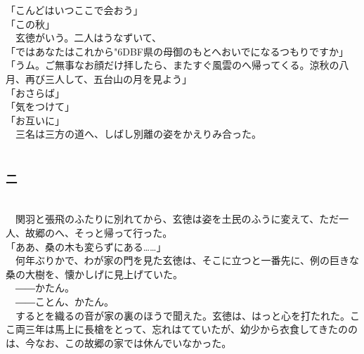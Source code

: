 \documentclass[
  paper=a5,
  fontsize=10pt,
  jafontsize=9.5pt,
  tate,                  %
  open_bracket_pos=nibu, %
]{jlreq}
\begin{document}
「こんどはいつここで会おう」\\


「この秋」\\


　玄徳がいう。二人はうなずいて、\\


「ではあなたはこれから{\char"6DBF}県の母御のもとへおいでになるつもりですか」\\


「うム。ご無事なお顔だけ拝したら、またすぐ風雲のへ帰ってくる。涼秋の八月、再び三人して、五台山の月を見よう」\\


「おさらば」\\


「気をつけて」\\


「お互いに」\\


　三名は三方の道へ、しばし別離の姿をかえりみ合った。\\

\\

\subsubsection{二}

\\


　関羽と張飛のふたりに別れてから、玄徳は姿を土民のふうに変えて、ただ一人、故郷のへ、そっと帰って行った。\\


「ああ、桑の木も変らずにある……」\\


　何年ぶりかで、わが家の門を見た玄徳は、そこに立つと一番先に、例の巨きな桑の大樹を、懐かしげに見上げていた。\\


　――かたん。\\


　――ことん、かたん。\\


　するとを織るの音が家の裏のほうで聞えた。玄徳は、はっと心を打たれた。ここ両三年は馬上に長槍をとって、忘れはてていたが、幼少から衣食してきたののは、今なお、この故郷の家では休んでいなかった。\\
\end{document}
